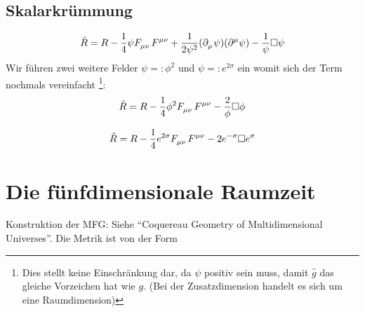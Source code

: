\subsection{Skalarkrümmung}
\begin{equation}
\hat{R}=R-\frac{1}{4}\psi\tensor{F}{_\mu_\nu}\tensor{F}{^\mu^\nu}
+\frac{1}{2\psi^2}(\pdif{_\mu}\psi)(\pdif{^\mu}\psi)
-\frac{1}{\psi}\square\psi
\end{equation}
Wir führen zwei weitere Felder $\psi=:\phi^2$ und $\psi=:e^{2\sigma}$ ein womit
sich der Term nochmals vereinfacht \footnote{Dies stellt keine Einschränkung
dar, da $\psi$ positiv sein muss, damit $\hat{g}$ das gleiche Vorzeichen hat wie $g$. (Bei der Zusatzdimension handelt es sich um
eine Raumdimension)}:
\begin{equation}
\hat{R}=R-\frac{1}{4}\phi^2\tensor{F}{_\mu_\nu}\tensor{F}{^\mu^\nu}
-\frac{2}{\phi}\square \phi
\end{equation}

\begin{equation}
\hat{R}=R-\frac{1}{4}e^{2\sigma}\tensor{F}{_\mu_\nu}\tensor{F}{^\mu^\nu}
-2e^{-\sigma}\square e^{\sigma}
\end{equation}

\section{Die fünfdimensionale Raumzeit}
Konstruktion der MFG: Siehe "`Coquereau Geometry of Multidimensional
Universes"'\cite{coquereaux1983geometry}.
Die Metrik ist von der Form
